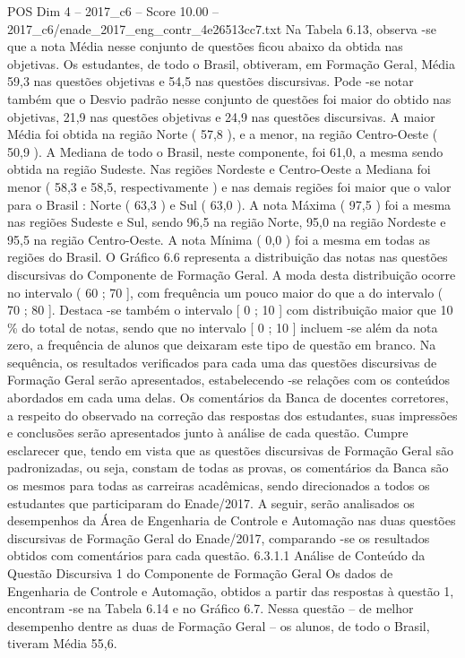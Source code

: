 \begin{textsample}{POS Dim 4 – 2017\_c6 – Score 10.00 – 2017\_c6/enade\_2017\_eng\_contr\_4e26513cc7.txt}
Na Tabela 6.13, observa -se que a nota Média nesse conjunto de questões ficou abaixo da obtida nas objetivas.
Os estudantes, de todo o Brasil, obtiveram, em Formação Geral, Média 59,3 nas questões objetivas e 54,5 nas questões discursivas.
Pode -se notar também que o Desvio padrão nesse conjunto de questões foi maior do obtido nas objetivas, 21,9 nas questões objetivas e 24,9 nas questões discursivas.
A maior Média foi obtida na região Norte ( 57,8 ), e a menor, na região Centro-Oeste ( 50,9 ).
A Mediana de todo o Brasil, neste componente, foi 61,0, a mesma sendo obtida na região Sudeste.
Nas regiões Nordeste e Centro-Oeste a Mediana foi menor ( 58,3 e 58,5, respectivamente ) e nas demais regiões foi maior que o valor para o Brasil : Norte ( 63,3 ) e Sul ( 63,0 ).
A nota Máxima ( 97,5 ) foi a mesma nas regiões Sudeste e Sul, sendo 96,5 na região Norte, 95,0 na região Nordeste e 95,5 na região Centro-Oeste.
A nota Mínima ( 0,0 ) foi a mesma em todas as regiões do Brasil.
O Gráfico 6.6 representa a distribuição das notas nas questões discursivas do Componente de Formação Geral.
A moda desta distribuição ocorre no intervalo ( 60 ; 70 ], com frequência um pouco maior do que a do intervalo ( 70 ; 80 ].
Destaca -se também o intervalo [ 0 ; 10 ] com distribuição maior que 10 \% do total de notas, sendo que no intervalo [ 0 ; 10 ] incluem -se além da nota zero, a frequência de alunos que deixaram este tipo de questão em branco.
Na sequência, os resultados verificados para cada uma das questões discursivas de Formação Geral serão apresentados, estabelecendo -se relações com os conteúdos abordados em cada uma delas.
Os comentários da Banca de docentes corretores, a respeito do observado na correção das respostas dos estudantes, suas impressões e conclusões serão apresentados junto à análise de cada questão.
Cumpre esclarecer que, tendo em vista que as questões discursivas de Formação Geral são padronizadas, ou seja, constam de todas as provas, os comentários da Banca são os mesmos para todas as carreiras acadêmicas, sendo direcionados a todos os estudantes que participaram do Enade/2017.
A seguir, serão analisados os desempenhos da Área de Engenharia de Controle e Automação nas duas questões discursivas de Formação Geral do Enade/2017, comparando -se os resultados obtidos com comentários para cada questão. 6.3.1.1 Análise de Conteúdo da Questão Discursiva 1 do Componente de Formação Geral Os dados de Engenharia de Controle e Automação, obtidos a partir das respostas à questão 1, encontram -se na Tabela 6.14 e no Gráfico 6.7.
Nessa questão – de melhor desempenho dentre as duas de Formação Geral – os alunos, de todo o Brasil, tiveram Média 55,6.

\end{textsample}
